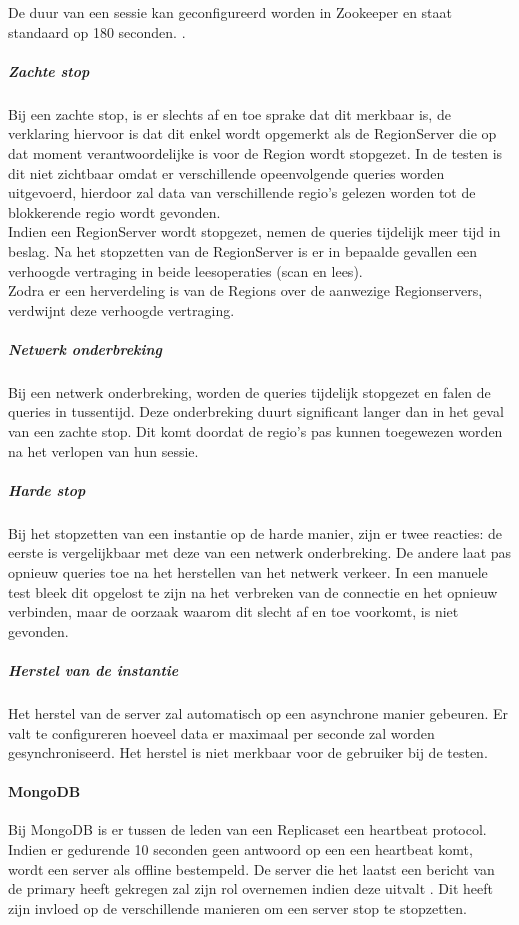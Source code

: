 De duur van een sessie kan geconfigureerd worden in Zookeeper en staat standaard op 180 seconden. \cite{hbase-doc}. 

\subparagraph{Zachte stop} Bij een zachte stop, is er slechts af en toe sprake dat dit merkbaar is, de verklaring hiervoor is dat dit enkel wordt opgemerkt als de RegionServer die op dat moment verantwoordelijke is voor de Region wordt stopgezet. In de testen is dit niet zichtbaar omdat er verschillende opeenvolgende queries worden uitgevoerd, hierdoor zal data van verschillende regio's gelezen worden tot de blokkerende regio wordt gevonden.  \\
Indien een RegionServer wordt stopgezet, nemen de queries tijdelijk meer tijd in beslag. Na het stopzetten van de RegionServer is er in bepaalde gevallen een verhoogde vertraging in beide leesoperaties (scan en lees). \\
Zodra er een herverdeling is van de Regions over de aanwezige Regionservers, verdwijnt deze verhoogde vertraging. 

\subparagraph{Netwerk onderbreking} Bij een netwerk onderbreking, worden de queries tijdelijk stopgezet en falen de queries in tussentijd. Deze onderbreking duurt significant langer dan in het geval van een zachte stop. Dit komt doordat de regio's pas kunnen toegewezen worden na het verlopen van hun sessie.  

\subparagraph{Harde stop} Bij het stopzetten van een instantie op de harde manier, zijn er twee reacties: de eerste is vergelijkbaar met deze van een netwerk onderbreking. De andere laat pas opnieuw queries toe na het herstellen van het netwerk verkeer. In een manuele test bleek dit opgelost te zijn na het verbreken van de connectie en het opnieuw verbinden, maar de oorzaak waarom dit slecht af en toe voorkomt, is niet gevonden. 

\subparagraph{Herstel van de instantie} Het herstel van de server zal automatisch op een asynchrone manier gebeuren. Er valt te configureren hoeveel data er maximaal per seconde zal worden gesynchroniseerd. Het herstel is niet merkbaar voor de gebruiker bij de testen. 

\paragraph{MongoDB} Bij MongoDB is er tussen de leden van een Replicaset een heartbeat protocol. Indien er gedurende 10 seconden geen antwoord op een een heartbeat komt, wordt een server als offline bestempeld. De server die het laatst een bericht van de primary heeft gekregen zal zijn rol overnemen indien deze uitvalt \cite{mongodb-manual}. Dit heeft zijn invloed op de verschillende manieren om een server stop te stopzetten. 

